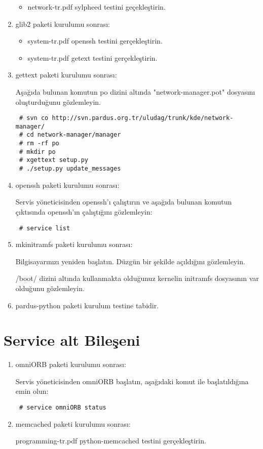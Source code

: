 \documentclass[a4paper,10pt]{article}
\begin{document}
\begin{enumerate}
\begin{itemize}
\item network-tr.pdf sylpheed testini geçekleştirin.
\end{itemize}

\item glib2 paketi kurulumu sonrası:
\begin{itemize}
 \item system-tr.pdf openssh testini gerçekleştirin.
\item system-tr.pdf getext testini gerçekleştirin.
\end{itemize}

\item gettext paketi kurulumu sonrası:

Aşağıda bulunan komutun po dizini altında "network-manager.pot" dosyasını oluşturduğunu gözlemleyin.
\begin{verbatim}
 # svn co http://svn.pardus.org.tr/uludag/trunk/kde/network-manager/
 # cd network-manager/manager
 # rm -rf po
 # mkdir po
 # xgettext setup.py 
 # ./setup.py update_messages
\end{verbatim}


\item openssh paketi kurulumu sonrası:

Servis yöneticisinden openssh'ı çalıştırın ve aşağıda bulunan komutun çıktısında openssh'ın çalıştığını gözlemleyin:
\begin{verbatim}
 # service list 
\end{verbatim}

\item mkinitramfs paketi kurulumu sonrası:

Bilgisayarınızı yeniden başlatın. Düzgün bir şekilde açıldığını gözlemleyin.

/boot/ dizini altında kullanmakta olduğunuz kernelin initramfs dosyasının var olduğunu gözlemleyin.

\item pardus-python paketi kurulum testine tabidir.

\end{enumerate}
\section{Service alt Bileşeni}
\begin{enumerate}
\item omniORB paketi kurulumu sonrası:

Servis yöneticisinden omniORB başlatın, aşağıdaki komut ile başlatıldığına emin olun:
\begin{verbatim}
 # service omniORB status
\end{verbatim}

 \item memcached paketi kurulumu sonrası:

  programming-tr.pdf python-memcached testini gerçekleştirin. 
\end{enumerate}
\end{document}
